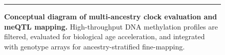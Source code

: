 \documentclass[12pt,oneside]{report}
\begin{document}

\clearpage

\begin{figure}[htb]
  \centering
  \rule{0.8\linewidth}{2in}
  \caption[Conceptual diagram of multi-ancestry clock evaluation and meQTL mapping.]{
    \textbf{Conceptual diagram of multi-ancestry clock evaluation and meQTL mapping.}
    High-throughput DNA methylation profiles are filtered, evaluated for biological age acceleration, and integrated with genotype arrays for ancestry-stratified fine-mapping.
  }
  \label{fig:method_overview}
\end{figure}
\clearpage


\clearpage

\printbibliography[heading=bibintoc, title={REFERENCES}]
\clearpage

\end{document}
